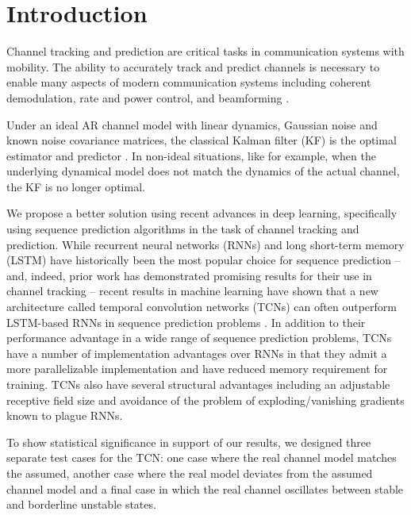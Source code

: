 \documentclass[twocolumn,letterpaper]{IEEEAerospaceCLS}  %
\begin{document}
\tableofcontents

\section{Introduction}
\label{sec:intro}

Channel tracking and prediction are critical tasks in communication systems with mobility. The ability to accurately track and predict channels is necessary to enable many aspects of modern communication systems including coherent demodulation, rate and power control, and beamforming \cite{181202986}.

Under an ideal AR channel model with linear dynamics, Gaussian noise and known noise covariance matrices, the classical Kalman filter (KF) is the optimal estimator and predictor \cite{kay1993fundamentals}.  In  non-ideal  situations,  like  for  example,  when  the underlying dynamical model does not match the dynamics of the actual channel, the KF is no longer optimal. 

We propose a better solution using recent advances in deep  learning, specifically using sequence prediction algorithms in the task of  channel  tracking  and  prediction. While recurrent neural networks (RNNs) and long short-term memory (LSTM) have historically been the most popular choice for sequence prediction -- and, indeed, prior work has demonstrated promising results for their use in channel tracking \cite{7508408} \cite{hochreiter1997long} -- recent results in machine learning have shown that a new architecture called temporal convolution networks (TCNs) can often outperform LSTM-based RNNs in sequence prediction problems \cite{BaiTCN2018}.  In addition to their performance advantage in a wide range of sequence prediction problems, TCNs have a number of implementation advantages over RNNs in that they admit a more parallelizable implementation and have reduced memory requirement for training. TCNs also have several structural advantages including an adjustable receptive field size and avoidance of the problem of exploding/vanishing gradients known to plague RNNs.

To show statistical significance in support of our results, we designed three separate test cases for the TCN: one case where the real channel model matches the assumed, another case where the real model deviates from the assumed channel model and a final case in which the real channel oscillates between stable and borderline unstable states. 
\end{document}

